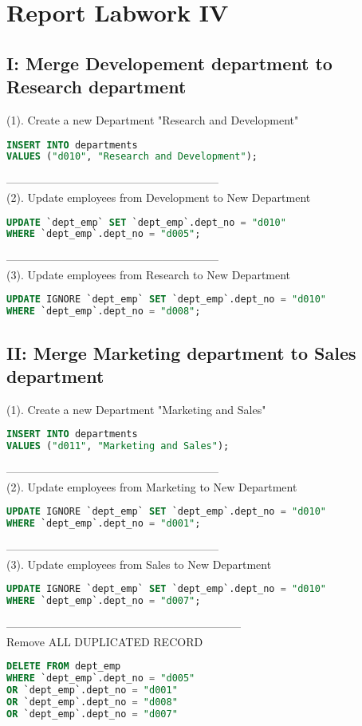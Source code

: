 \documentclass[12pt]{report}
\begin{document}
\section*{Report Labwork IV}

\subsection*{I: Merge Developement department to Research department}

(1). Create a new Department "Research and Development"
\begin{lstlisting}[language=sql]
INSERT INTO departments 
VALUES ("d010", "Research and Development");
\end{lstlisting}
---------------------------------------------------------
\\
(2). Update employees from Development to New Department
\begin{lstlisting}[language=sql]
UPDATE `dept_emp` SET `dept_emp`.dept_no = "d010" 
WHERE `dept_emp`.dept_no = "d005";
\end{lstlisting}
---------------------------------------------------------
\\
(3). Update employees from Research to New Department
\begin{lstlisting}[language=sql]
UPDATE IGNORE `dept_emp` SET `dept_emp`.dept_no = "d010" 
WHERE `dept_emp`.dept_no = "d008";
\end{lstlisting}


\subsection*{II: Merge Marketing department to Sales department}

(1). Create a new Department "Marketing and Sales"
\begin{lstlisting}[language=sql]
INSERT INTO departments 
VALUES ("d011", "Marketing and Sales");
\end{lstlisting}
---------------------------------------------------------
\\
(2). Update employees from Marketing to New Department
\begin{lstlisting}[language=sql]
UPDATE IGNORE `dept_emp` SET `dept_emp`.dept_no = "d010" 
WHERE `dept_emp`.dept_no = "d001";
\end{lstlisting}
---------------------------------------------------------
\\
(3). Update employees from Sales to New Department
\begin{lstlisting}[language=sql]
UPDATE IGNORE `dept_emp` SET `dept_emp`.dept_no = "d010" 
WHERE `dept_emp`.dept_no = "d007";
\end{lstlisting}


---------------------------------------------------------------
\\
Remove ALL DUPLICATED RECORD
\begin{lstlisting}[language=sql]
DELETE FROM dept_emp 
WHERE `dept_emp`.dept_no = "d005" 
OR `dept_emp`.dept_no = "d001" 
OR `dept_emp`.dept_no = "d008" 
OR `dept_emp`.dept_no = "d007" 
\end{lstlisting}
\end{document}
